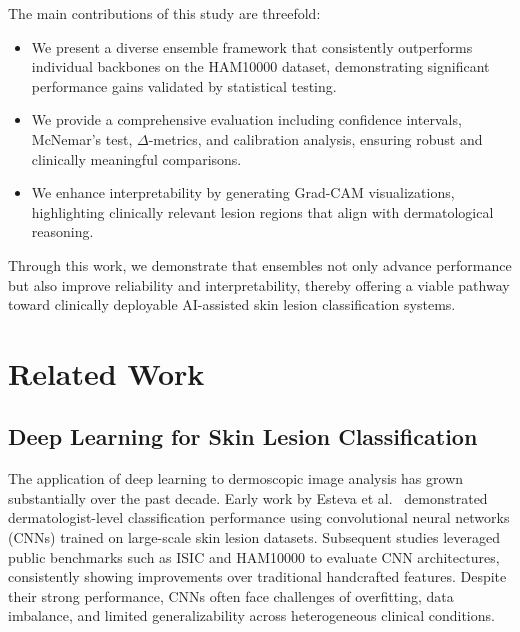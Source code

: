 \documentclass[preprint,12pt]{elsarticle}
\begin{document}
The main contributions of this study are threefold:
\begin{itemize}[leftmargin=1.5em]
    \item We present a diverse ensemble framework that consistently outperforms individual backbones on the HAM10000 dataset, demonstrating significant performance gains validated by statistical testing.
    \item We provide a comprehensive evaluation including confidence intervals, McNemar’s test, $\Delta$-metrics, and calibration analysis, ensuring robust and clinically meaningful comparisons.
    \item We enhance interpretability by generating Grad-CAM visualizations, highlighting clinically relevant lesion regions that align with dermatological reasoning.
\end{itemize}

Through this work, we demonstrate that ensembles not only advance performance but also improve reliability and interpretability, thereby offering a viable pathway toward clinically deployable AI-assisted skin lesion classification systems.

\section{Related Work}

\subsection{Deep Learning for Skin Lesion Classification}
The application of deep learning to dermoscopic image analysis has grown substantially over the past decade. Early work by Esteva et al.\ \cite{esteva2017dermatologist} demonstrated dermatologist-level classification performance using convolutional neural networks (CNNs) trained on large-scale skin lesion datasets. Subsequent studies leveraged public benchmarks such as ISIC and HAM10000 \cite{tschandl2018ham10000} to evaluate CNN architectures, consistently showing improvements over traditional handcrafted features. Despite their strong performance, CNNs often face challenges of overfitting, data imbalance, and limited generalizability across heterogeneous clinical conditions.
\end{document}
